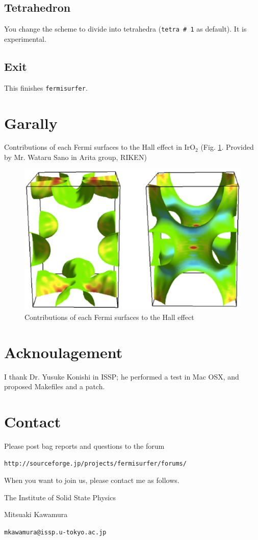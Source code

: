 \documentclass[12pt]{article}
\begin{document}
\subsection{Tetrahedron}

You change the scheme to divide into tetrahedra (\texttt{tetra \# 1} as default).
It is experimental.

\subsection{Exit}

This finishes \verb|fermisurfer|.

\section{Garally}

Contributions of each Fermi surfaces to the Hall effect
in IrO$_2$
(Fig. \ref{fig_iro2}. Provided by Mr. Wataru Sano in Arita group, RIKEN)

\begin{figure}[!ht]
  \includegraphics[width=17cm]{figs/iro2.eps}
  \caption{Contributions of each Fermi surfaces to the Hall effect}
  \label{fig_iro2}
\end{figure}

\section{Acknoulagement}

I thank Dr. Yusuke Konishi in ISSP;
he performed a test in Mac OSX,
and proposed Makefiles and a patch.

\section{Contact}

Please post bag reports and questions to the forum
\begin{verbatim}
http://sourceforge.jp/projects/fermisurfer/forums/
\end{verbatim}

When you want to join us, please contact me as follows.

The Institute of Solid State Physics

Mitsuaki Kawamura

\verb|mkawamura@issp.u-tokyo.ac.jp|
\end{document}

